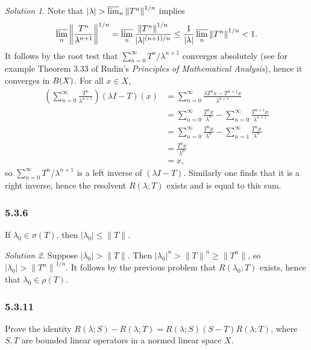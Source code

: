 \documentclass{report}
\newcommand{\norm}[1]{{\lVert #1 \rVert}}
\newcommand{\snorm}[1]{\left\lVert #1 \right\rVert}
\let\sc\relax
\newcommand{\sc}[1]{\mathscr{#1}}
\theoremstyle{remark}
\newtheorem*{solution}{Solution}
\begin{document}
\begin{solution}
  Note that $|\lambda| > \varlimsup_n \norm{T^n}^{1/n}$ implies
  \begin{equation*}
    \varlimsup_n \snorm{\frac{T^n}{\lambda^{n+1}}}^{1/n} = \varlimsup_n \frac{\norm{T^n}^{1/n}}{|\lambda|^{(n+1)/n}} \le \frac{1}{|\lambda|} \varlimsup_n \norm{T^n}^{1/n} < 1.
  \end{equation*}
  It follows by the root test that $\sum_{n=0}^\infty T^n/\lambda^{n+1}$ converges absolutely (see for example Theorem 3.33 of Rudin's \emph{Principles of Mathematical Analysis}), hence it converges in $\sc B(X)$. For all $x \in X$,
  \begin{equation*}
    \begin{split}
      \left( \sum_{n=0}^\infty \frac{T^n}{\lambda^{n+1}} \right) (\lambda I - T)(x) &= \sum_{n=0}^\infty \frac{\lambda T^n x - T^{n+1}x}{\lambda^{n+1}} \\
      &= \sum_{n=0}^\infty \frac{T^n x}{\lambda^n} - \sum_{n=0}^\infty \frac{T^{n+1}x}{\lambda^{n+1}} \\
      &= \sum_{n=0}^\infty \frac{T^n x}{\lambda^n} - \sum_{n=1}^\infty \frac{T^n x}{\lambda^n} \\
      &= \frac{T^0 x}{\lambda^0} \\
      &= x,
    \end{split}
  \end{equation*}
  so $\sum_{n=0}^\infty T^n/\lambda^{n+1}$ is a left inverse of $(\lambda I - T)$. Similarly one finds that it is a right inverse, hence the resolvent $R(\lambda; T)$ exists and is equal to this sum.
\end{solution}

\subsubsection*{5.3.6}
If $\lambda_0 \in \sigma(T)$, then $|\lambda_0| \le \norm{T}$.

\begin{solution}
  Suppose $|\lambda_0| > \norm T$. Then $|\lambda_0|^n > \norm T^n \ge \norm{T^n}$, so $|\lambda_0| > \norm{T^n}^{1/n}$. It follows by the previous problem that $R(\lambda_0; T)$ exists, hence that $\lambda_0 \in \rho(T)$.
\end{solution}


\subsubsection*{5.3.11}
Prove the identity $R(\lambda;S) - R(\lambda;T) = R(\lambda;S)(S-T)R(\lambda;T)$, where $S,T$ are bounded linear operators in a normed linear space $X$.
\end{document}
